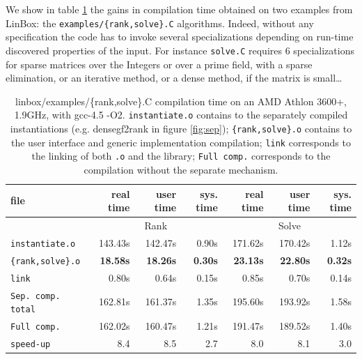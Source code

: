 \documentclass{article}
\newcommand{\linbox}{{\sc LinBox}\xspace}
\begin{document}
We show in table \ref{tab:compilation} the gains in compilation time
obtained on two examples from \linbox: the \texttt{examples/\{rank,solve\}.C} algorithms. 
 Indeed, without any specification
 the code has to invoke several specializations depending on
 run-time discovered properties of the input. For instance
 \texttt{solve.C} requires 6 specializations for sparse
 matrices over the Integers or over a prime field, with a sparse
 elimination, or an iterative method, or a dense method, if the matrix
 is small\ldots
\begin{table}[ht]\center
\begin{tabular}{|l||r|r|r||r|r|r|}
\hline
file                      &  real time   &  user time   &  sys. time  &  real time   &  user time   &  sys. time \\
\hline
 & \multicolumn{3}{|c||}{Rank}& \multicolumn{3}{|c|}{Solve}\\
\hline
\texttt{instantiate.o} & 143.43s & 142.47s & 0.90s & 171.62s & 170.42s & 1.12s\\
\texttt{\{rank,solve\}.o} & \bf 18.58s & \bf 18.26s & \bf 0.30s & \bf 23.13s & \bf 22.80s & \bf 0.32s\\
\texttt{link} & 0.80s & 0.64s & 0.15s & 0.85s & 0.70s & 0.14s\\
\hline
\texttt{Sep. comp. total} & 162.81s & 161.37s & 1.35s & 195.60s & 193.92s & 1.58s\\
\hline
\texttt{Full comp.} & 162.02s & 160.47s & 1.21s & 191.47s & 189.52s & 1.40s\\
\hline
\hline
\texttt{speed-up} & 8.4 & 8.5 & 2.7 & 8.0 & 8.1 & 3.0\\
\hline
\end{tabular} 
\caption{linbox/examples/\{rank,solve\}.C compilation time on an AMD
  Athlon 3600+, 1.9GHz, with gcc-4.5 -O2. \texttt{instantiate.o} contains to the separately compiled
  instantiations (e.g. densegf2rank in figure \ref{fig:sep});
  \texttt{\{rank,solve\}.o} contains to the user interface and generic
  implementation compilation; \texttt{link} corresponds to the linking
  of both \texttt{.o} and the library; \texttt{Full comp.} corresponds
  to the compilation without the separate
  mechanism.}\label{tab:compilation}
\end{table}
\end{document}
